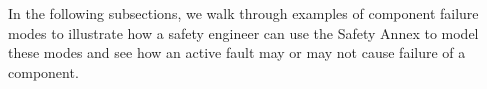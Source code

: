 

In the following subsections, we walk through examples of component failure modes to illustrate how a safety engineer can use the Safety Annex to model these modes and see how an active fault may or may not cause failure of a component.


